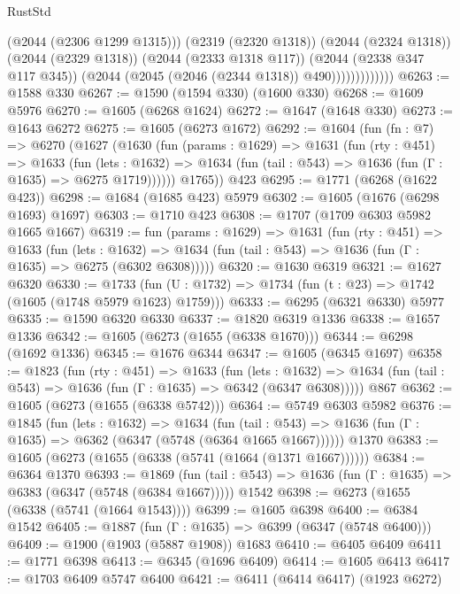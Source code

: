 \begin{lexlean}{RustStd}
\begin{coremodule}
                            (@2044 (@2306 @1299 @1315)))
                          (@2319 (@2320 @1318))
                          (@2044 (@2324 @1318))
                          (@2044 (@2329 @1318))
                          (@2044 (@2333 @1318 @117))
                          (@2044 (@2338 @347 @117 @345))
                          (@2044 (@2045 (@2046 (@2344 @1318)) @490)))))))))))))
@6263 := @1588 @330
@6267 := @1590 (@1594 @330) (@1600 @330)
@6268 := @1609 @5976
@6270 := @1605 (@6268 @1624)
@6272 := @1647 (@1648 @330)
@6273 := @1643 @6272
@6275 := @1605 (@6273 @1672)
@6292 := @1604
    (fun (fn : @7) =>
    @6270
      (@1627
        (@1630
          (fun (params : @1629) =>
          @1631
            (fun (rty : @451) =>
            @1633
              (fun (lets : @1632) =>
              @1634 (fun (tail : @543) => @1636 (fun (Γ : @1635) => @6275 @1719))))))
        @1765))
    @423
@6295 := @1771 (@6268 (@1622 @423))
@6298 := @1684 (@1685 @423) @5979
@6302 := @1605 (@1676 (@6298 @1693) @1697)
@6303 := @1710 @423
@6308 := @1707 (@1709 @6303 @5982 @1665 @1667)
@6319 := fun (params : @1629) =>
  @1631
    (fun (rty : @451) =>
    @1633
      (fun (lets : @1632) =>
      @1634 (fun (tail : @543) => @1636 (fun (Γ : @1635) => @6275 (@6302 @6308)))))
@6320 := @1630 @6319
@6321 := @1627 @6320
@6330 := @1733 (fun (U : @1732) => @1734 (fun (t : @23) => @1742 (@1605 (@1748 @5979 @1623) @1759)))
@6333 := @6295 (@6321 @6330) @5977
@6335 := @1590 @6320 @6330
@6337 := @1820 @6319 @1336
@6338 := @1657 @1336
@6342 := @1605 (@6273 (@1655 (@6338 @1670)))
@6344 := @6298 (@1692 @1336)
@6345 := @1676 @6344
@6347 := @1605 (@6345 @1697)
@6358 := @1823
    (fun (rty : @451) =>
    @1633
      (fun (lets : @1632) =>
      @1634 (fun (tail : @543) => @1636 (fun (Γ : @1635) => @6342 (@6347 @6308)))))
    @867
@6362 := @1605 (@6273 (@1655 (@6338 @5742)))
@6364 := @5749 @6303 @5982
@6376 := @1845
    (fun (lets : @1632) =>
    @1634
      (fun (tail : @543) => @1636 (fun (Γ : @1635) => @6362 (@6347 (@5748 (@6364 @1665 @1667))))))
    @1370
@6383 := @1605 (@6273 (@1655 (@6338 (@5741 (@1664 (@1371 @1667))))))
@6384 := @6364 @1370
@6393 := @1869
    (fun (tail : @543) => @1636 (fun (Γ : @1635) => @6383 (@6347 (@5748 (@6384 @1667)))))
    @1542
@6398 := @6273 (@1655 (@6338 (@5741 (@1664 @1543))))
@6399 := @1605 @6398
@6400 := @6384 @1542
@6405 := @1887 (fun (Γ : @1635) => @6399 (@6347 (@5748 @6400)))
@6409 := @1900 (@1903 (@5887 @1908)) @1683
@6410 := @6405 @6409
@6411 := @1771 @6398
@6413 := @6345 (@1696 @6409)
@6414 := @1605 @6413
@6417 := @1703 @6409 @5747 @6400
@6421 := @6411 (@6414 @6417) (@1923 @6272)

\end{coremodule}
\end{lexlean}
